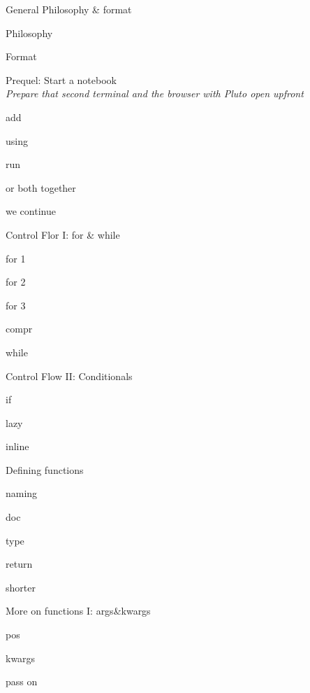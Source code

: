 \documentclass[a5paper,12pt,DIV=14,footheight=-30pt, headheight=60pt, twoside=off]{scrartcl}
\newenvironment{sublist}[1][]{%
  \color{juliapurple}%
  \quad\begin{enumerate*}[#1]%
}%
{\end{enumerate*}}
\begin{document}
\begin{enumerate}[resume]
    \item General Philosophy \& format
    \begin{sublist}
        \item Philosophy \item Format
    \end{sublist}
    \item Prequel: Start a notebook\\
    \emph{Prepare that second terminal and the browser with Pluto open upfront}
    \\
    \begin{sublist}
        \item add \item using \item run \item or both together \item we continue
    \end{sublist}
    \item Control Flor I: for \& while
    \begin{sublist}
        \item for 1 \item for 2 \item for 3 \item compr \item while
    \end{sublist}
    \item Control Flow II: Conditionals
    \begin{sublist}
        \item if \item lazy \item inline
    \end{sublist}
    \item Defining functions
    \begin{sublist}
        \item naming \item doc \item type \item return \item shorter
    \end{sublist}
    \item More on functions I: args\&kwargs
    \begin{sublist}
        \item pos \item kwargs \item pass on

\end{sublist}
\end{enumerate}
\end{document}

